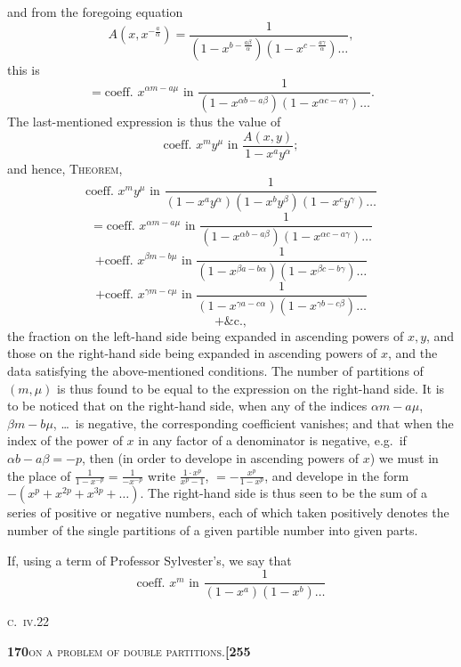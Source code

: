 \documentclass[11pt]{article}
\begin{document}
\noindent and from the foregoing equation
\[
A(x, x^{-\frac{a}{\alpha}}) = \frac{1}{(1 - x^{b - \frac{a\beta}{\alpha}})(1 - x^{c - \frac{a\gamma}{\alpha}})\ldots},
\]
this is
\[
= \text{coeff.\ } x^{\alpha m - a\mu} \text{ in } \frac{1}{(1 - x^{\alpha b - a\beta})(1 - x^{\alpha c - a\gamma})\ldots}.
\]
The last-mentioned expression is thus the value of
\[
\text{coeff.\ } x^m y^{\mu} \text{ in } \frac{A(x, y)}{1 - x^a y^{\alpha}};
\]
and hence, \textsc{Theorem},
\[
\text{coeff.\ } x^m y^{\mu} \text{ in } \frac{1}{(1 - x^a y^{\alpha})(1 - x^b y^{\beta})(1 - x^c y^{\gamma})\ldots}
\]
\[
= \text{coeff.\ } x^{\alpha m - a\mu} \text{ in } \frac{1}{(1 - x^{\alpha b - a\beta})(1 - x^{\alpha c - a\gamma})\ldots}
\]
\[
+ \text{coeff.\ } x^{\beta m - b\mu} \text{ in } \frac{1}{(1 - x^{\beta a - b\alpha})(1 - x^{\beta c - b\gamma})\ldots}
\]
\[
+ \text{coeff.\ } x^{\gamma m - c\mu} \text{ in } \frac{1}{(1 - x^{\gamma a - c\alpha})(1 - x^{\gamma b - c\beta})\ldots}
\]
\[
+ \text{\&c.},
\]
the fraction on the left-hand side being expanded in ascending powers of $x, y$, and those on the right-hand side being expanded in ascending powers of $x$, and the data satisfying the above-mentioned conditions. The number of partitions of $(m, \mu)$ is thus found to be equal to the expression on the right-hand side. It is to be noticed that on the right-hand side, when any of the indices $\alpha m - a\mu$, $\beta m - b\mu$, \ldots\ is negative, the corresponding coefficient vanishes; and that when the index of the power of $x$ in any factor of a denominator is negative, e.g.\ if $\alpha b - a\beta = -p$, then (in order to develope in ascending powers of $x$) we must in the place of $\tfrac{1}{1 - x^{-p}} = \tfrac{1}{-x^{-p}}$ write $\tfrac{1 \cdot x^p}{x^p - 1}$, $= -\tfrac{x^p}{1 - x^p}$, and develope in the form $-(x^p + x^{2p} + x^{3p} + \ldots)$. The right-hand side is thus seen to be the sum of a series of positive or negative numbers, each of which taken positively denotes the number of the single partitions of a given partible number into given parts.

If, using a term of Professor Sylvester's, we say that
\[
\text{coeff.\ } x^m \text{ in } \frac{1}{(1 - x^a)(1 - x^b)\ldots}
\]

\hfill\textsc{c.~iv.}\hfill 22

\newpage

\noindent\textbf{170}\hfill\textsc{on a problem of double partitions.}\hfill\textbf{[255}

\medskip
\end{document}
